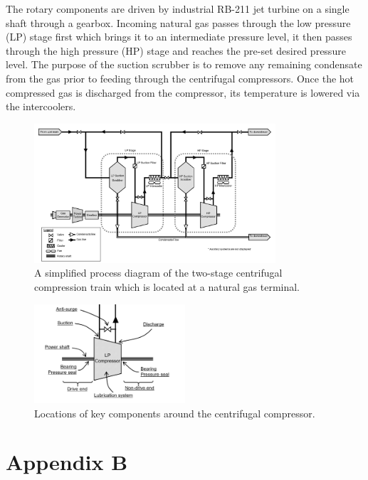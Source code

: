 \documentclass[runningheads]{llncs}
\begin{document}
The rotary components are driven by industrial RB-211 jet turbine on a single shaft through a gearbox. Incoming natural gas passes through the low pressure (LP) stage first which brings it to an intermediate pressure level, it then passes through the high pressure (HP) stage and reaches the pre-set desired pressure level. The purpose of the suction scrubber is to remove any remaining condensate from the gas prior to feeding through the centrifugal compressors. Once the hot compressed gas is discharged from the compressor, its temperature is lowered via the intercoolers.

\begin{figure}[H]
	\centering
	\includegraphics[width=0.8\textwidth]{process_diagram.PNG}
	\caption{A simplified process diagram of the two-stage centrifugal compression train which is located at a natural gas terminal.}
	\label{fig:process_diagram}
\end{figure}

\begin{figure}[H]
	\centering
	\includegraphics[width=0.5\textwidth]{lp-stage.PNG}
	\caption{Locations of key components around the centrifugal compressor.}
	\label{fig:lp_stage}
\end{figure}

\newpage
\section*{Appendix B}
\end{document}
